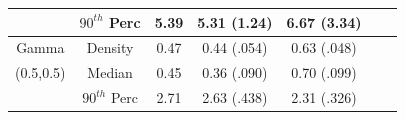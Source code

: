 \documentclass[11pt]{article}
\numberwithin{equation}{section}
\begin{document}
\begin{table}
{\begin{center}
\begin{tabular} {| c | c | c | c | c | c | c |}
				& $90^{th}$ Perc&	5.39			& 	5.31 (1.24)		&	6.67 (3.34)	 \\
	

	\hline
	
		 
	 Gamma		& Density		& 	0.47			& 0.44 (.054)			&	0.63 (.048)	\\
	 
	 
	 (0.5,0.5)		& Median 		&	0.45			& 0.36 (.090)			& 	0.70 (.099)	  \\ 
				
				& $90^{th}$ Perc&	2.71			& 2.63 (.438)			&	2.31 (.326)	 \\
	


	\hline		
	
\end{tabular}
\end{center}
}

\end{table}
\end{document}
